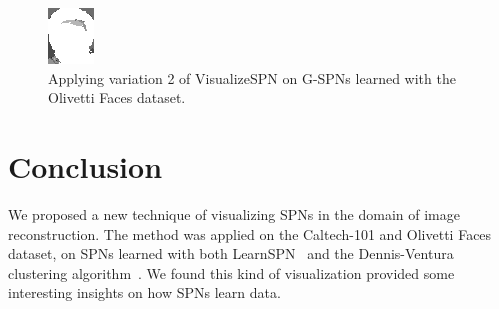\documentclass{article}
\begin{document}
\begin{figure}[t]
\begin{minipage}[c]{.21\linewidth}
    \centering\centerline{\includegraphics[width=\linewidth]{imgs/gens_oliv/0/sums/8_2.png}}
  \end{minipage}
  \caption{Applying variation 2 of VisualizeSPN on G-SPNs learned with the Olivetti Faces dataset.
  \label{fig:g-oliv}}
\end{figure}

\section{Conclusion}
\label{sec:conc}

We proposed a new technique of visualizing SPNs in the domain of image reconstruction. The method
was applied on the Caltech-101 and Olivetti Faces dataset, on SPNs learned with both
LearnSPN~\cite{gens13} and the Dennis-Ventura clustering algorithm~\cite{dennis12}. We found this
kind of visualization provided some interesting insights on how SPNs learn data.




\end{document}
